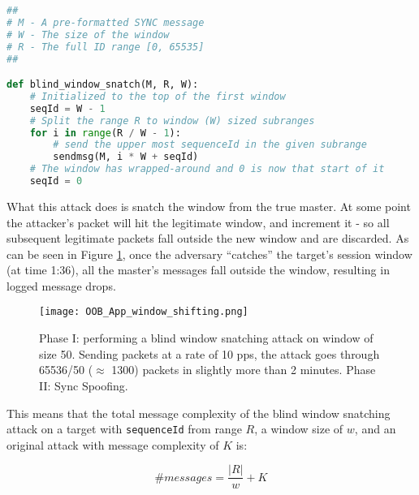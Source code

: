 \documentclass[11pt]{article}
\begin{document}
\begin{lstlisting}[float,floatplacement=t,
					frame=single,
					language=Python,
					basicstyle=\ttfamily,
					keywordstyle=\ttfamily\bfseries,
					commentstyle=\ttfamily\itshape\color{gray!90},
					caption={Python code for the \emph{blind window snatching} attack}]
##
# M - A pre-formatted SYNC message
# W - The size of the window
# R - The full ID range [0, 65535]
##

def blind_window_snatch(M, R, W):
    # Initialized to the top of the first window
    seqId = W - 1
    # Split the range R to window (W) sized subranges
    for i in range(R / W - 1):
        # send the upper most sequenceId in the given subrange
        sendmsg(M, i * W + seqId)
    # The window has wrapped-around and 0 is now that start of it
    seqId = 0
\end{lstlisting}

\renewcommand{\ttdefault}{cmtt}



What this attack does is snatch the window from the true master. At some point the attacker's packet will hit the legitimate window, and increment it - so all subsequent legitimate packets fall outside the new window and are discarded. As can be seen in Figure \ref{Win shift fig}, once the adversary ``catches'' the target's session window (at time 1:36), all the master's messages fall outside the window, resulting in logged message drops.



\begin{figure}[t]

\centerline{\texttt{[image: OOB\_App\_window\_shifting.png]}}

\caption{Phase I: performing a blind window snatching attack on window of size 50. Sending packets at a rate of 10 pps, the attack goes through 65536/50 ($\approx$ 1300) packets in slightly more than 2 minutes. Phase II: Sync Spoofing.}

\label{Win shift fig}

\end{figure}



This means that the total message complexity of the blind window snatching attack on a target with \texttt{sequenceId} from range $R$, a window size of $w$, and an original attack with message complexity of $K$ is: 

\begin{equation} \label{WindowComplex}
\#messages=\frac{|R|}{w} + K
\end{equation}
\end{document}
